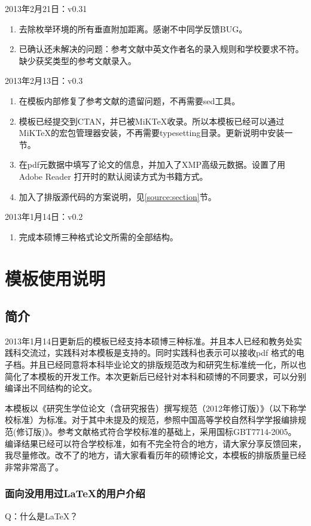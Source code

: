 \noindent
2013年2月21日：v0.31
\begin{enumerate}
\item 去除枚举环境的所有垂直附加距离。感谢不中同学反馈BUG。
\item 已确认还未解决的问题：参考文献中英文作者名的录入规则和学校要求不符。缺少获奖类型的参考文献录入。
\end{enumerate}

\noindent
2013年2月13日：v0.3
\begin{enumerate}
\item 在模板内部修复了参考文献的遗留问题，不再需要sed工具。
\item 模板已经提交到CTAN，并已被MiKTeX收录。所以本模板已经可以通过MiKTeX的宏包管理器安装，不再需要typesetting目录。更新说明中安装一节。
\item 在pdf元数据中填写了论文的信息，并加入了XMP高级元数据。设置了用Adobe Reader 打开时的默认阅读方式为书籍方式。
\item 加入了排版源代码的方案说明，见\ref{source:section}节。
\end{enumerate}

\noindent
2013年1月14日：v0.2
\begin{enumerate}
\item 完成本硕博三种格式论文所需的全部结构。
\end{enumerate}

\chapter{模板使用说明}
\section{简介}
2013年1月14日更新后的模板已经支持本硕博三种标准。并且本人已经和教务处实践科交流过，实践科对本模板是支持的。同时实践科也表示可以接收pdf 格式的电子档。并且已经同意将本科毕业论文的排版规范改为和研究生标准统一化，所以也简化了本模板的开发工作。本次更新后已经针对本科和硕博的不同要求，可以分别编译出不同结构的论文。

本模板以《研究生学位论文（含研究报告）撰写规范（2012年修订版）》（以下称学校标准）为标准。对于其中未提及的规范，参照中国高等学校自然科学学报编排规范(修订版)》。参考文献格式符合学校标准的基础上，采用国标GBT7714-2005。 编译结果已经可以符合学校标准，如有不完全符合的地方，请大家分享反馈回来，我尽量修改。改不了的地方，请大家看看历年的硕博论文，本模板的排版质量已经非常非常高了。
\subsection{面向没用用过\LaTeX{}的用户介绍}
    Q：什么是\LaTeX{}？

